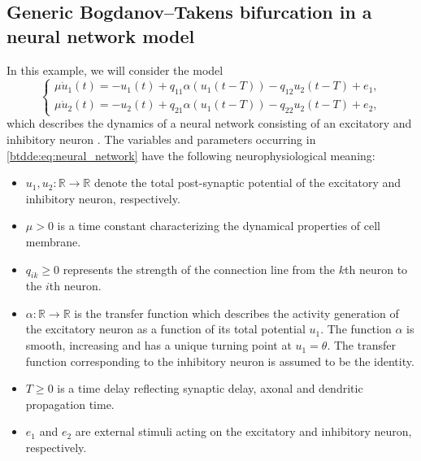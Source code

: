 \subsection{\ifthesis \phantom{ } \fi Generic Bogdanov--Takens bifurcation in a neural network model}
In this example, we will consider the model 
\begin{equation}
\label{btdde:eq:neural_network}
\begin{cases}
\mu\dot{u}_1(t) = -u_1(t) + q_{11}\alpha(u_1(t - T))-q_{12}u_2(t - T) + e_1,\\
\mu\dot{u}_2(t) = -u_2(t) + q_{21}\alpha(u_1(t - T))-q_{22}u_2(t - T) + e_2,
\end{cases}
\end{equation}
which describes the dynamics of a neural network consisting of an
excitatory and inhibitory neuron \cite{giannakopoulos2001bifurcations}.
The variables and parameters occurring in \cref{btdde:eq:neural_network}
have the following neurophysiological meaning:
\begin{itemize}
\item $u_1,u_2:\mathbb{R}\rightarrow\mathbb{R}$ denote the total post-synaptic
potential of the excitatory and inhibitory neuron, respectively.
\item $\mu>0$ is a time constant characterizing the dynamical properties
of cell membrane.
\item $q_{ik}\geq0$ represents the strength of the connection line from
the $k$th neuron to the $i$th neuron.
\item $\alpha:\mathbb{R}\rightarrow\mathbb{R}$ is the transfer function
which describes the activity generation of the excitatory neuron as
a function of its total potential $u_1$. The function $\alpha$
is smooth, increasing and has a unique turning point at $u_1 = \theta$.
The transfer function corresponding to the inhibitory neuron is assumed
to be the identity.
\item $T\geq0$ is a time delay reflecting synaptic delay, axonal and dendritic
propagation time.
\item $e_1$ and $e_2$ are external stimuli acting on the excitatory
and inhibitory neuron, respectively.
\end{itemize}

